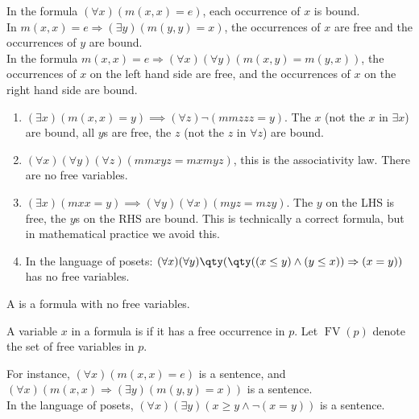 \begin{example}
    In the formula $(\forall x)(m(x,x) = e)$, each occurrence of $x$ is bound. \\
    In $m(x,x) = e \Rightarrow (\exists y)(m(y,y) = x)$, the occurrences of $x$ are free and the occurrences of $y$ are bound. \\
    In the formula $m(x,x) = e \Rightarrow (\forall x)(\forall y)(m(x,y) = m(y,x))$, the occurrences of $x$ on the left hand side are free, and the occurrences of $x$ on the right hand side are bound.

    \begin{enumerate}
        \item $(\exists x) (m(x, x) = y) \implies (\forall z) \neg (mmzzz = y)$. The $x$ (not the $x$ in $\exists x$) are bound, all $y$s are free, the $z$ (not the $z$ in $\forall z$) are bound.
        \item $(\forall x) (\forall y) (\forall z) (mm xyz = mx myz)$, this is the associativity law. There are no free variables.
        \item $(\exists x)(m xx = y) \implies (\forall y) (\forall x) (m yz = m zy)$. The $y$ on the LHS is free, the $y$s on the RHS are bound.
        This is technically a correct formula, but in mathematical practice we avoid this.
        \item In the language of posets: $(\forall x) (\forall y) \qty(\qty((x \leq y) \wedge (y \leq x)) \implies (x = y))$ has no free variables.
    \end{enumerate}
\end{example}

\begin{definition}[Sentence]
    A  is a formula with no free variables.
\end{definition}

\begin{definition}[Free]
    A variable $x$ in a formula is  if it has a free occurrence in $p$.
    Let $\operatorname{FV}(p)$ denote the set of free variables in $p$.
\end{definition}

\begin{example}
    For instance, $(\forall x)(m(x,x) = e)$ is a sentence, and $(\forall x)(m(x,x) \Rightarrow (\exists y)(m(y,y) = x))$ is a sentence. \\
    In the language of posets, $(\forall x)(\exists y)(x \geq y \wedge \neg(x = y))$ is a sentence.
\end{example}

